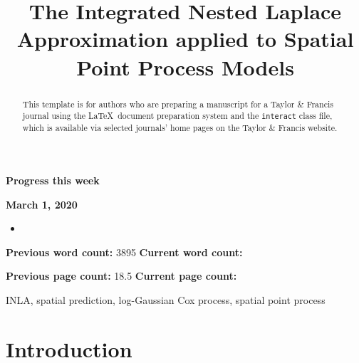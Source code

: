 \documentclass[]{interact}
\begin{document}
{\Large\bf Progress this week}

{\large\bf March 1, 2020}

\begin{itemize}

\item 

\end{itemize}

\vfill

\textbf{Previous word count:} 3895 \hfill \textbf{Current word count:} 

\textbf{Previous page count:} 18.5 \hfill \textbf{Current page count:} 

\pagebreak


\title{The Integrated Nested Laplace Approximation applied to Spatial Point Process Models}

\author{
}

\maketitle

\begin{abstract}
This template is for authors who are preparing a manuscript for a Taylor \& Francis journal using the \LaTeX\ document preparation system and the \texttt{interact} class file, which is available via selected journals' home pages on the Taylor \& Francis website.
\end{abstract}

\begin{keywords}
INLA, spatial prediction, log-Gaussian Cox process, spatial point process
\end{keywords}


\section{Introduction}
\label{intro}

\end{document}
